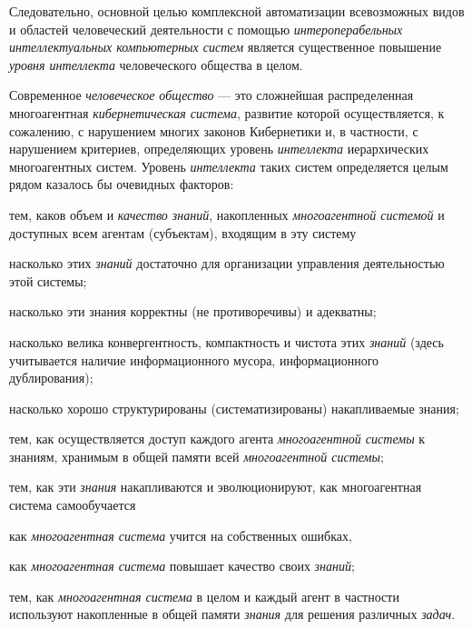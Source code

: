 Следовательно, основной целью комплексной автоматизации всевозможных видов и областей человеческий деятельности с помощью \textit{интероперабельных интеллектуальных компьютерных систем} является существенное повышение \textit{уровня интеллекта}  человеческого общества в целом.

Современное \textit{человеческое общество} --- это сложнейшая распределенная многоагентная \textit{кибернетическая система}, развитие которой осуществляется, к сожалению, с нарушением многих законов Кибернетики и, в частности, с нарушением критериев, определяющих уровень \textit{интеллекта} иерархических многоагентных систем. Уровень \textit{интеллекта} таких систем определяется целым рядом казалось бы очевидных факторов:
\begin{textitemize}
	\item тем, каков объем и \textit{качество знаний}, накопленных \textit{многоагентной системой} и доступных всем агентам (субъектам), входящим в эту систему
	\begin{textitemize}
		\item насколько этих \textit{знаний} достаточно для организации управления деятельностью этой системы;
		\item насколько эти знания корректны (не противоречивы) и адекватны;
		\item насколько велика конвергентность, компактность и чистота этих \textit{знаний} (здесь учитывается наличие информационного мусора, информационного дублирования);
		\item насколько хорошо структурированы (систематизированы) накапливаемые знания;
	\end{textitemize}
	\item тем, как осуществляется доступ каждого агента \textit{многоагентной системы} к знаниям, хранимым в общей памяти всей \textit{многоагентной системы};
	\medskip
	\item тем, как эти \textit{знания} накапливаются и эволюционируют, как многоагентная система самообучается
	\begin{textitemize}
		\item как \textit{многоагентная система} учится на собственных ошибках,
		\item как \textit{многоагентная система} повышает качество своих \textit{знаний};
	\end{textitemize}
	\item тем, как \textit{многоагентная система} в целом и каждый агент в частности используют накопленные в общей памяти \textit{знания} для решения различных \textit{задач}.
\end{textitemize}

